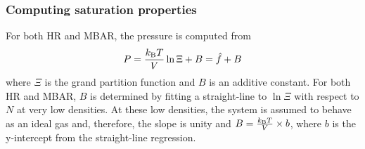 \documentclass[journal=jced,manuscript=article]{achemso}
\begin{document}
%

\subsubsection{Computing saturation properties} \label{sec: Saturation}

For both HR and MBAR, the pressure is computed from
\begin{equation} \label{eq: press}
P = \frac{k_{\rm B} T}{V} \ln \Xi + B = \hat f + B
\end{equation}
where $\Xi$ is the grand partition function and $B$ is an additive constant. For both HR and MBAR, $B$ is determined by fitting a straight-line to $\ln \Xi$ with respect to $N$ at very low densities. At these low densities, the system is assumed to behave as an ideal gas and, therefore, the slope is unity and $B = \frac{k_{\rm B} T}{V} \times b$, where $b$ is the y-intercept from the straight-line regression.
\end{document}
